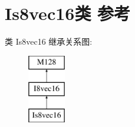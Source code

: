 \hypertarget{class_is8vec16}{}\section{Is8vec16类 参考}
\label{class_is8vec16}
类 Is8vec16 继承关系图\+:\begin{figure}[H]
\begin{center}
\leavevmode
\includegraphics[height=3.000000cm]{class_is8vec16}
\end{center}
\end{figure}

